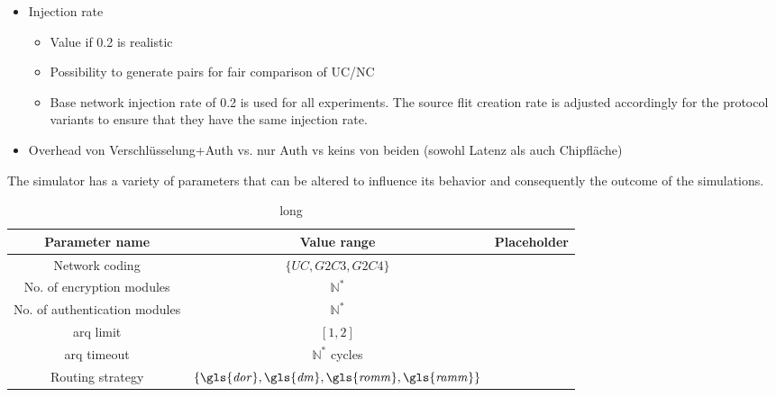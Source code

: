 \begin{itemize}
    \item Injection rate
        \begin{itemize}
            \item Value if 0.2 is realistic
            \item Possibility to generate pairs for fair comparison of UC/NC
            \item Base network injection rate of 0.2 is used for all experiments. The source flit creation rate is adjusted accordingly for the
                protocol variants to ensure that they have the same injection rate.
        \end{itemize}
    \item Overhead von Verschlüsselung+Auth vs. nur Auth vs keins von beiden (sowohl Latenz als auch Chipfläche)
\end{itemize}

The simulator has a variety of parameters that can be altered to influence its behavior and consequently the outcome of the simulations.


\begin{table}
    \centering
    \begin{tabulary}{\textwidth}{C|C|C}
        Parameter name & Value range & Placeholder \\\hline
        Network coding & $\{\mathit{UC}, \mathit{G2C3}, \mathit{G2C4}\}$ & \pNCMode{} \\
        No. of encryption modules & $\mathbb{N}^*$ & \pEncMods{} \\
        No. of authentication modules & $\mathbb{N}^*$ & \pAuthMods{} \\
        \Gls{arq} limit & $[1, 2]$ & \pARQLimit{} \\
        \Gls{arq} timeout & $\mathbb{N}^*$ cycles & \pARQTimeout{} \\
        Routing strategy & $\{\mathit{\gls{dor}}, \mathit{\gls{dm}}, \mathit{\gls{romm}}, \mathit{\gls{ramm}}\}$ & \pRStrat{} \\
    \end{tabulary}
    \caption[short]{long}
    \label{tab:inputparams}
\end{table}%

